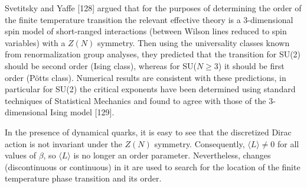 Svetitsky and Yaffe [128] argued that for the purposes of determining the
order of the finite temperature transition the relevant effective theory is
a 3-dimensional spin model of short-ranged interactions (between Wilson
lines reduced to spin variables) with a $Z(N)$ symmetry. Then using the
universality classes known from renormalization group analyses, they
predicted that the transition for SU(2) should be second order (Ising
class), whereas for SU($N \geq 3$) it should be first order (P\"otts
class). Numerical results are consistent with these predictions, in
particular for SU(2) the critical exponents have been determined using
standard techniques of Statistical Mechanics and found to agree with those
of the 3-dimensional Ising model [129].

In the presence of dynamical quarks, it is easy to see that the discretized
Dirac action is not invariant under the $Z(N)$ symmetry. Consequently,
$\langle L\rangle \neq 0$ for all values of $\beta$, so $\langle L\rangle$
is no longer an order parameter. Nevertheless, changes (discontinuous or
continuous) in it are used to search for the location of the finite
temperature phase transition and its order.
